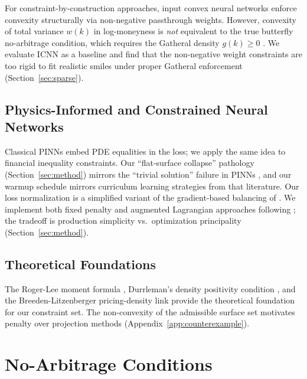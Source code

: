 \documentclass[11pt,a4paper]{article}
\begin{document}
For constraint-by-construction approaches, input convex neural networks \citep{amos2017} enforce convexity structurally via non-negative passthrough weights. However, convexity of total variance $w(k)$ in log-moneyness is \textit{not} equivalent to the true butterfly no-arbitrage condition, which requires the Gatheral density $g(k) \geq 0$ \citep{gatheral2004}. We evaluate ICNN as a baseline and find that the non-negative weight constraints are too rigid to fit realistic smiles under proper Gatheral enforcement (Section~\ref{sec:sparse}).

\subsection{Physics-Informed and Constrained Neural Networks}

Classical PINNs \citep{raissi2019} embed PDE equalities in the loss; we apply the same idea to financial inequality constraints. Our ``flat-surface collapse'' pathology (Section~\ref{sec:method}) mirrors the ``trivial solution'' failure in PINNs \citep{krishnapriyan2021}, and our warmup schedule mirrors curriculum learning strategies from that literature. Our loss normalization is a simplified variant of the gradient-based balancing of \citet{wang2021}. We implement both fixed penalty and augmented Lagrangian approaches following \citet{lu2021, basir2023}; the tradeoff is production simplicity vs.\ optimization principality (Section~\ref{sec:method}).

\subsection{Theoretical Foundations}

The Roger-Lee moment formula \citep{lee2004}, Durrleman's density positivity condition \citep{durrleman2004}, and the Breeden-Litzenberger pricing-density link \citep{breeden1978} provide the theoretical foundation for our constraint set. The non-convexity of the admissible surface set \citep{roper2010} motivates penalty over projection methods (Appendix~\ref{app:counterexample}).

\section{No-Arbitrage Conditions}
\label{sec:constraints}
\end{document}
